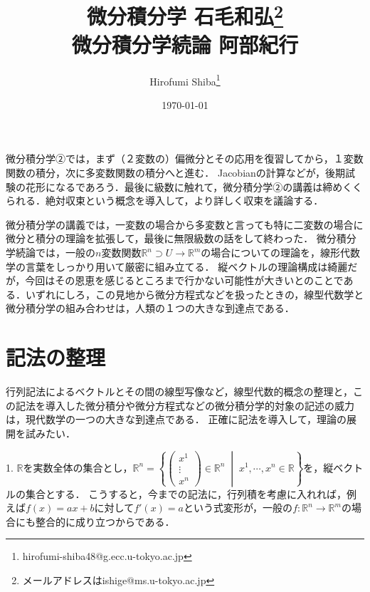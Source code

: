 \documentclass[uplatex, dvipdfmx]{jsreport}
\title{微分積分学 石毛和弘\thanks{メールアドレスはishige@ms.u-tokyo.ac.jp} \\ 微分積分学続論 阿部紀行}
\author{Hirofumi Shiba\thanks{hirofumi-shiba48@g.ecc.u-tokyo.ac.jp}}
\date{\today}
\begin{document}
\tableofcontents

微分積分学②では，まず（２変数の）偏微分とその応用を復習してから，１変数関数の積分，次に多変数関数の積分へと進む．
Jacobianの計算などが，後期試験の花形になるであろう．最後に級数に触れて，微分積分学②の講義は締めくくられる．絶対収束という概念を導入して，より詳しく収束を議論する．

微分積分学の講義では，一変数の場合から多変数と言っても特に二変数の場合に微分と積分の理論を拡張して，最後に無限級数の話をして終わった．
微分積分学続論では，一般の$n$変数関数$\mathbb{R}^n\supset U\to\mathbb{R}^m$の場合についての理論を，線形代数学の言葉をしっかり用いて厳密に組み立てる．
縦ベクトルの理論構成は綺麗だが，今回はその恩恵を感じるところまで行かない可能性が大きいとのことである．いずれにしろ，この見地から微分方程式などを扱ったときの，線型代数学と微分積分学の組み合わせは，人類の１つの大きな到達点である．

\chapter*{記法の整理}
行列記法によるベクトルとその間の線型写像など，線型代数的概念の整理と，この記法を導入した微分積分や微分方程式などの微分積分学的対象の記述の威力は，現代数学の一つの大きな到達点である．
正確に記法を導入して，理論の展開を試みたい．

1. $\mathbb{R}$を実数全体の集合とし，$\mathbb{R}^n=\left\{\begin{pmatrix}x^1\\\vdots\\x^n\end{pmatrix}\in\mathbb{R}^n\;\middle| \;x^1,\cdots,x^n\in\mathbb{R} \right\}$を，縦ベクトルの集合とする．
こうすると，今までの記法に，行列積を考慮に入れれば，例えば$f(x)=ax+b$に対して$f'(x)=a$という式変形が，一般の$f:\mathbb{R}^n\to\mathbb{R}^m$の場合にも整合的に成り立つからである．
\end{document}
